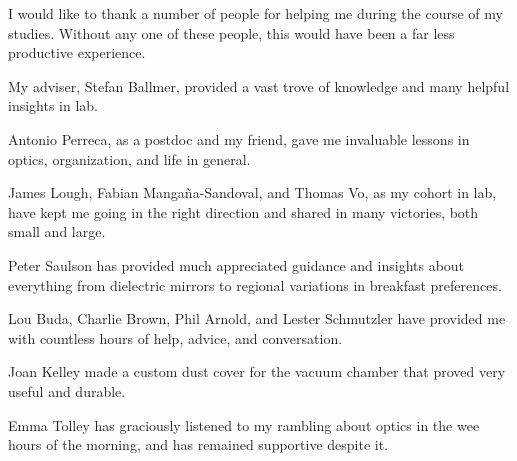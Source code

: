 I would like to thank a number of people for helping me during the course of my studies. Without any one of these people, this would have been
a far less productive experience.

My adviser, Stefan Ballmer, provided a vast trove of knowledge and many helpful insights in lab.

Antonio Perreca, as a postdoc and my friend, gave me invaluable lessons in optics, organization, and life in general.  

James Lough, Fabian Manga\~na-Sandoval, and Thomas Vo, as my cohort in lab, have kept me going in the right direction and shared in many victories, both small and large. 

Peter Saulson has provided much appreciated guidance and insights about everything from dielectric mirrors to regional variations in breakfast preferences.

Lou Buda, Charlie Brown, Phil Arnold, and Lester Schmutzler have provided me with countless hours of help, advice, and conversation.

Joan Kelley made a custom dust cover for the vacuum chamber that proved very useful and durable.  

Emma Tolley has graciously listened to my rambling about optics in the wee hours of the morning, and has remained supportive despite it. 

